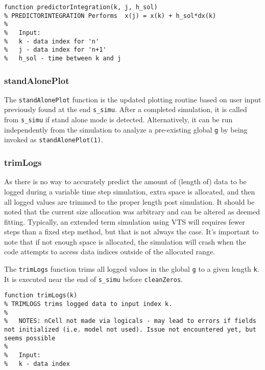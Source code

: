 \begin{verbatim}
function predictorIntegration(k, j, h_sol)
% PREDICTORINTEGRATION Performs  x(j) = x(k) + h_sol*dx(k)
%
%   Input:
%   k - data index for 'n'
%   j - data index for 'n+1'
%   h_sol - time between k and j
\end{verbatim}

\subsubsection{standAlonePlot}  
The \verb|standAlonePlot| function is the updated plotting routine based on user input previously found at the end \verb|s_simu|.
After a completed simulation, it is called from \verb|s_simu| if stand alone mode is detected.
Alternatively, it can be run independently from the simulation to analyze a pre-existing global \verb|g| by being invoked as \verb|standAlonePlot(1)|.

\subsubsection{trimLogs}  
As there is no way to accurately predict the amount of (length of) data to be logged during a variable time step simulation, extra space is allocated, and then all logged values are trimmed to the proper length post simulation.
It should be noted that the current size allocation was arbitrary and can be altered as deemed fitting.
Typically, an extended term simulation using VTS will requires fewer steps than a fixed step method, but that is not always the case.
It's important to note that if not enough space is allocated, the simulation will crash when the code attempts to access data indices outside of the allocated range.

The \verb|trimLogs| function trims all logged values in the global \verb|g| to a given length \verb|k|.
It is executed near the end of \verb|s_simu| before \verb|cleanZeros|.

\begin{verbatim}
function trimLogs(k)
% TRIMLOGS trims logged data to input index k.
%
%   NOTES: nCell not made via logicals - may lead to errors if fields not initialized (i.e. model not used). Issue not encountered yet, but seems possible
%
%   Input:
%   k - data index
\end{verbatim} 
